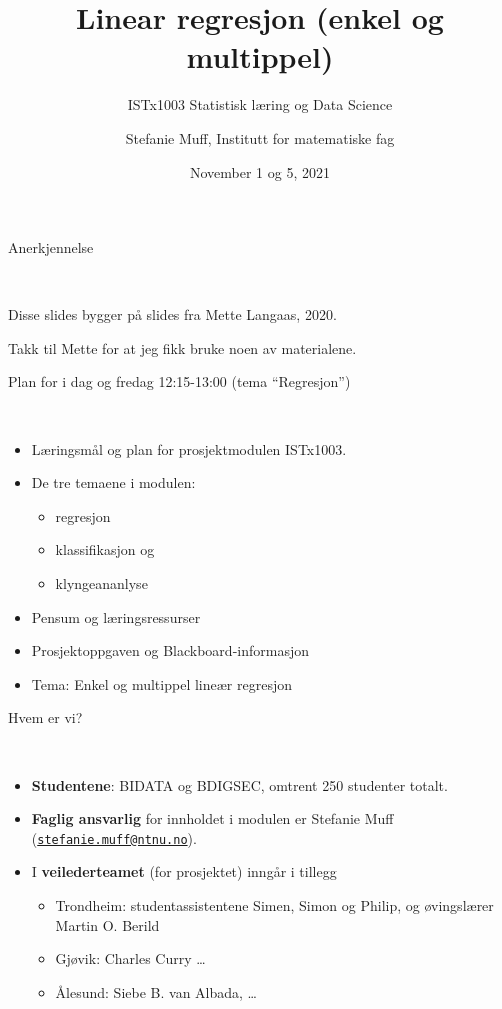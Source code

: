 \documentclass[10pt,ignorenonframetext,]{beamer}
\title{Linear regresjon (enkel og multippel)}
\subtitle{ISTx1003 Statistisk læring og Data Science}
\author{Stefanie Muff, Institutt for matematiske fag}
\date{November 1 og 5, 2021}
\providecommand{\tightlist}{%
  \setlength{\itemsep}{0pt}\setlength{\parskip}{0pt}}
\begin{document}
\frame{\titlepage}

\begin{frame}{Anerkjennelse}
\protect\hypertarget{anerkjennelse}{}

\(~\)

Disse slides bygger på slides fra Mette Langaas, 2020.

Takk til Mette for at jeg fikk bruke noen av materialene.

\end{frame}

\begin{frame}{Plan for i dag og fredag 12:15-13:00 (tema ``Regresjon'')}
\protect\hypertarget{plan-for-i-dag-og-fredag-1215-1300-tema-regresjon}{}

\(~\)

\begin{itemize}
\item
  Læringsmål og plan for prosjektmodulen ISTx1003.
\item
  De tre temaene i modulen:

  \begin{itemize}
  \tightlist
  \item
    regresjon
  \item
    klassifikasjon og
  \item
    klyngeananlyse
  \end{itemize}
\item
  Pensum og læringsressurser
\item
  Prosjektoppgaven og Blackboard-informasjon
\item
  Tema: Enkel og multippel lineær regresjon
\end{itemize}

\end{frame}

\begin{frame}{Hvem er vi?}
\protect\hypertarget{hvem-er-vi}{}

\(~\)

\begin{itemize}
\item
  \textbf{Studentene}: BIDATA og BDIGSEC, omtrent 250 studenter totalt.
\item
  \textbf{Faglig ansvarlig} for innholdet i modulen er Stefanie Muff
  (\href{mailto:stefanie.muff@ntnu.no}{\nolinkurl{stefanie.muff@ntnu.no}}).
\item
  I \textbf{veilederteamet} (for prosjektet) inngår i tillegg

  \begin{itemize}
  \tightlist
  \item
    Trondheim: studentassistentene Simen, Simon og Philip, og
    øvingslærer Martin O. Berild
  \item
    Gjøvik: Charles Curry \ldots{}
  \item
    Ålesund: Siebe B. van Albada, \ldots{}
  \end{itemize}
\end{itemize}

\end{frame}
\end{document}
